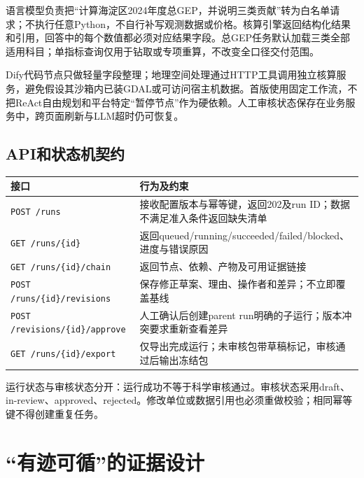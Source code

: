 \documentclass[12pt,a4paper,fontset=fandol]{ctexart}
\newcommand{\file}[1]{\nolinkurl{#1}}
\begin{document}
语言模型负责把“计算海淀区2024年度总GEP，并说明三类贡献”转为白名单请求；不执行任意Python，不自行补写观测数据或价格。核算引擎返回结构化结果和引用，回答中的每个数值都必须对应结果字段。总GEP任务默认加载三类全部适用科目；单指标查询仅用于钻取或专项重算，不改变全口径交付范围。

Dify代码节点只做轻量字段整理；地理空间处理通过HTTP工具调用独立核算服务，避免假设其沙箱内已装GDAL或可访问宿主机数据。首版使用固定工作流，不把ReAct自由规划和平台特定“暂停节点”作为硬依赖。人工审核状态保存在业务服务中，跨页面刷新与LLM超时仍可恢复。

\subsection{API和状态机契约}
\begin{longtable}{P{5.7cm}P{7.7cm}}
\toprule 接口 & 行为及约束 \\\midrule\endhead
\file{POST /runs} & 接收配置版本与幂等键，返回202及run ID；数据不满足准入条件返回缺失清单 \\
\file{GET /runs/{id}} & 返回queued/running/succeeded/failed/blocked、进度与错误原因 \\
\file{GET /runs/{id}/chain} & 返回节点、依赖、产物及可用证据链接 \\
\file{POST /runs/{id}/revisions} & 保存修正草案、理由、操作者和差异；不立即覆盖基线 \\
\file{POST /revisions/{id}/approve} & 人工确认后创建parent run明确的子运行；版本冲突要求重新查看差异 \\
\file{GET /runs/{id}/export} & 仅导出完成运行；未审核包带草稿标记，审核通过后输出冻结包 \\
\bottomrule
\end{longtable}
运行状态与审核状态分开：运行成功不等于科学审核通过。审核状态采用draft、in-review、approved、rejected。修改单位或数据引用也必须重做校验；相同幂等键不得创建重复任务。

\section{“有迹可循”的证据设计}
\end{document}
